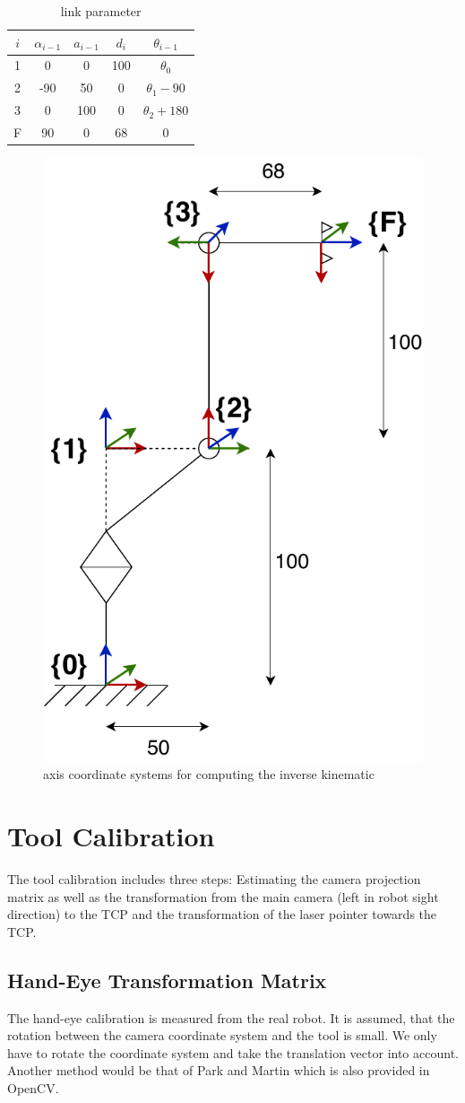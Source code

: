\documentclass[11pt,twoside,twocolumn,a4paper]{article}
\begin{document}
\begin{table}[h]
	\centering
	\begin{tabular}{ | c | c | c | c | c | }
		\hline
		$i$ & $\alpha_{i-1}$ & $a_{i-1}$ & $d_i$ & $\theta_{i-1}$\\ 
		\hline \hline
		1 & 0 & 0 & 100 & $\theta_0$\\  
		2 & -90 & 50 & 0 & $\theta_1 - 90$\\ 
		3 & 0 & 100 & 0 & $\theta_2 + 180$\\ 
		F & 90 & 0 & 68 & $0$\\
		\hline
	\end{tabular}
	\caption{link parameter }
	\label{tab:link_parameter}
\end{table} 

\begin{figure}[h]
	\centering
	\includegraphics[width=0.35\columnwidth]{images/robot_axis_coord.pdf}
	\caption{axis coordinate systems for computing the inverse kinematic}
	\label{fig:robot-axis-coord}
\end{figure}



\section{Tool Calibration}
The tool calibration includes three steps: Estimating the camera projection matrix as well as the transformation from the main camera (left in robot sight direction) to the TCP and the transformation of the laser pointer towards the TCP. 

\subsection{Hand-Eye Transformation Matrix}
The hand-eye calibration is measured from the real robot. It is assumed, that the rotation between the camera coordinate system and the tool is small. We only have to rotate the coordinate system and take the translation vector into account. Another method would be that of Park and Martin \cite{ParkHandEye} which is also provided in OpenCV. 
\end{document}
